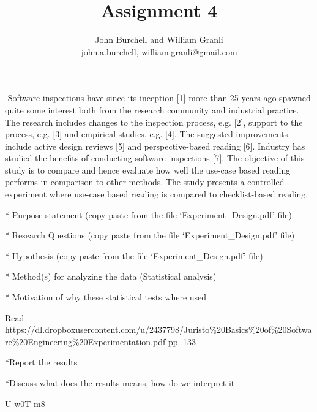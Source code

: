 \documentclass[10pt,twocolumn]{article}
\begin{document}
\title{Assignment 4}

\author{John Burchell and William Granli \\
john.a.burchell, william.granli@gmail.com}


\maketitle
\thispagestyle{empty}




​
Software inspections have since its inception [1] more than
25 years ago spawned quite some interest both from the
research community and industrial practice. The research
includes changes to the inspection process, e.g. [2], support to
the process, e.g. [3] and empirical studies, e.g. [4]. The
suggested improvements include active design reviews [5] and
perspective-based reading [6]. Industry has studied the
benefits of conducting software inspections [7].
The objective of this study is to compare and hence
evaluate how well the use-case based reading performs in
comparison to other methods. The study presents a controlled
experiment where use-case based reading is compared to
checklist-based reading.


* Purpose statement (copy paste from the file ‘Experiment\_Design.pdf’ file)

* Research Questions (copy paste from the file ‘Experiment\_Design.pdf’ file)

* Hypothesis (copy paste from the file ‘Experiment\_Design.pdf’ file)

* Method(s) for analyzing the data (Statistical analysis)

* Motivation of why these statistical tests where used

Read \url{https://dl.dropboxusercontent.com/u/2437798/Juristo%20Basics%20of%20Software%20Engineering%20Experimentation.pdf} pp. 133

*Report the results

*Discuss what does the results means, how do we interpret it






U w0T m8
\end{document}
